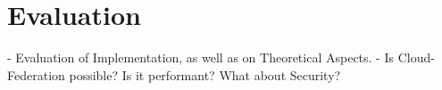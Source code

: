\chapter{Evaluation}
- Evaluation of Implementation, as well as on Theoretical Aspects.
- Is Cloud-Federation possible? Is it performant? What about Security?